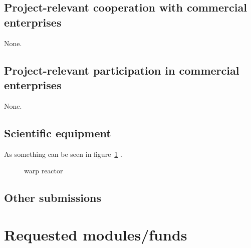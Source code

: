\documentclass{scrartcl}
\begin{document}
\subsection{Project-relevant cooperation with commercial enterprises}
None.

\subsection{Project-relevant participation in commercial enterprises}
None.

\subsection{Scientific equipment}
As something can be seen in figure~\ref{fig:some_nice_graph} .
\begin{figure}
\centering
{}
\caption{warp reactor}
\label{fig:some_nice_graph}
\end{figure}

\subsection{Other submissions}


\section{Requested modules/funds}
\end{document}
